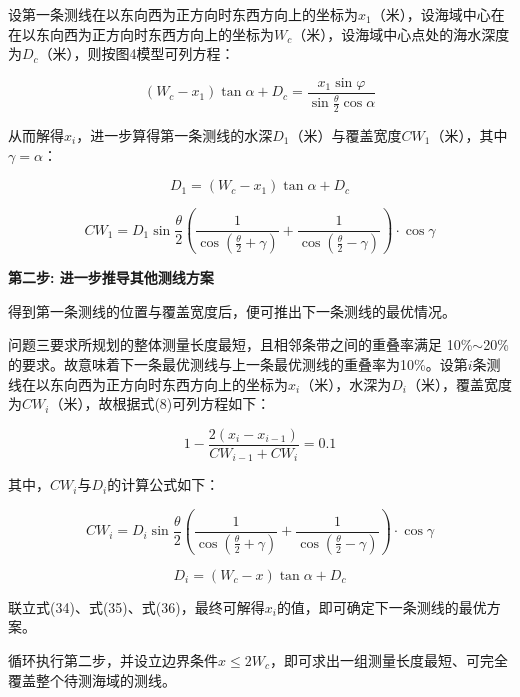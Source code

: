 设第一条测线在以东向西为正方向时东西方向上的坐标为$x_1$（米），设海域中心在在以东向西为正方向时东西方向上的坐标为$W_c$（米），设海域中心点处的海水深度为$D_c$（米），则按图4模型可列方程：

\begin{equation}
    (W_c - x_1) \tan\alpha+D_c = \frac{x_1\sin \varphi}{\sin \frac{\theta}{2} \cos \alpha}
\end{equation}

从而解得$x_i$，进一步算得第一条测线的水深$D_1$（米）与覆盖宽度$CW_1$（米），其中$\gamma = \alpha$：

\begin{equation}
    D_1 =  (W_c - x_1) \tan{\alpha} + D_c
\end{equation}

\begin{equation}
    CW_1 = D_1\sin\frac{\theta}{2}\left(\frac{1}{\cos(\frac{\theta}{2}+\gamma)} + \frac{1}{\cos(\frac{\theta}{2}-\gamma)}\right) \cdot \cos \gamma
\end{equation}

\textbf{第二步: 进一步推导其他测线方案}

得到第一条测线的位置与覆盖宽度后，便可推出下一条测线的最优情况。

问题三要求所规划的整体测量长度最短，且相邻条带之间的重叠率满足 10\%$\sim$20\% 的要求。故意味着下一条最优测线与上一条最优测线的重叠率为10\%。设第$i$条测线在以东向西为正方向时东西方向上的坐标为$x_i$（米），水深为$D_i$（米），覆盖宽度为$CW_i$（米），故根据式(8)可列方程如下：

\begin{equation}
    1-\frac{2(x_i-x_{i-1})}{CW_{i-1}+CW_i} = 0.1
\end{equation}

其中，$CW_i$与$D_i$的计算公式如下：

\begin{equation}
    CW_i = D_i\sin\frac{\theta}{2}\left(\frac{1}{\cos(\frac{\theta}{2}+\gamma)} + \frac{1}{\cos(\frac{\theta}{2}-\gamma)}\right) \cdot \cos \gamma
\end{equation}

\begin{equation}
    D_i =  (W_c - x) \tan{\alpha} + D_c
\end{equation}

联立式(34)、式(35)、式(36)，最终可解得$x_i$的值，即可确定下一条测线的最优方案。

循环执行第二步，并设立边界条件$ x \leq 2W_c $，即可求出一组测量长度最短、可完全覆盖整个待测海域的测线。

